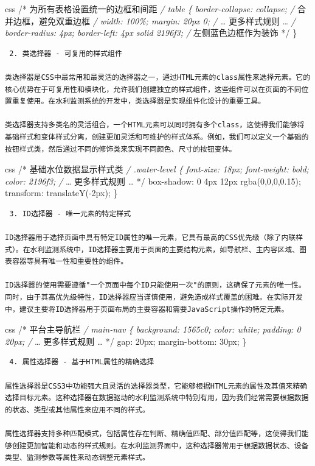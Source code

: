 css /* 为所有表格设置统一的边框和间距 \emph{/ table \{ border-collapse: collapse; /} 合并边框，避免双重边框 \emph{/ width: 100\%; margin: 20px 0; /} \ldots{} 更多样式规则 \ldots{} \emph{/ border-radius: 4px; border-left: 4px solid 2196f3; /} 左侧蓝色边框作为装饰 */ \}

\begin{lstlisting}
 2. 类选择器 - 可复用的样式组件

类选择器是CSS中最常用和最灵活的选择器之一，通过HTML元素的class属性来选择元素。它的核心优势在于可复用性和模块化，允许我们创建独立的样式组件，这些组件可以在页面的不同位置重复使用。在水利监测系统的开发中，类选择器是实现组件化设计的重要工具。

类选择器支持多类名的灵活组合，一个HTML元素可以同时拥有多个class，这使得我们能够将基础样式和变体样式分离，创建更加灵活和可维护的样式体系。例如，我们可以定义一个基础的按钮样式类，然后通过不同的修饰类来实现不同颜色、尺寸的按钮变体。
\end{lstlisting}

css /* 基础水位数据显示样式类 \emph{/ .water-level \{ font-size: 18px; font-weight: bold; color: 2196f3; /} \ldots{} 更多样式规则 \ldots{} */ box-shadow: 0 4px 12px rgba(0,0,0,0.15); transform: translateY(-2px); \}

\begin{lstlisting}
 3. ID选择器 - 唯一元素的特定样式

ID选择器用于选择页面中具有特定ID属性的唯一元素，它具有最高的CSS优先级（除了内联样式）。在水利监测系统中，ID选择器主要用于页面的主要结构元素，如导航栏、主内容区域、图表容器等具有唯一性和重要性的组件。

ID选择器的使用需要遵循"一个页面中每个ID只能使用一次"的原则，这确保了元素的唯一性。同时，由于其高优先级特性，ID选择器应当谨慎使用，避免造成样式覆盖的困难。在实际开发中，建议主要将ID选择器用于页面布局的主要容器和需要JavaScript操作的特定元素。
\end{lstlisting}

css /* 平台主导航栏 \emph{/ main-nav \{ background: 1565c0; color: white; padding: 0 20px; /} \ldots{} 更多样式规则 \ldots{} */ gap: 20px; margin-bottom: 30px; \}

\begin{lstlisting}
 4. 属性选择器 - 基于HTML属性的精确选择

属性选择器是CSS3中功能强大且灵活的选择器类型，它能够根据HTML元素的属性及其值来精确选择目标元素。这种选择器在数据驱动的水利监测系统中特别有用，因为我们经常需要根据数据的状态、类型或其他属性来应用不同的样式。

属性选择器支持多种匹配模式，包括属性存在判断、精确值匹配、部分值匹配等，这使得我们能够创建更加智能和动态的样式规则。在水利监测界面中，这种选择器常用于根据数据状态、设备类型、监测参数等属性来动态调整元素样式。
\end{lstlisting}

